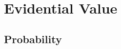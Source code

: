 \documentclass[10pt]{article}
\begin{document}
\section{Evidential Value}
\label{sec:str}

\subsection{Probability}



\end{document}
